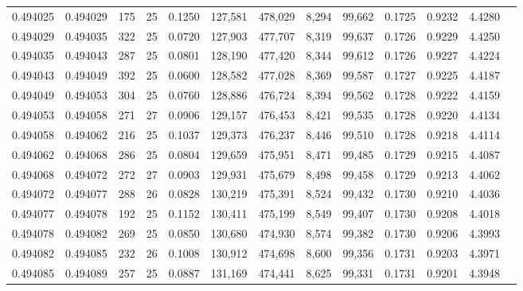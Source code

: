 \begin{tabular}{rrrrrrrrrrrrr}
0.494025 & 0.494029 & 175 &  25 &                                     0.1250 & 127,581 & 478,029 &   8,294 &  99,662 & 0.1725 & 0.9232 & 4.4280 \\
0.494029 & 0.494035 & 322 &  25 &                                     0.0720 & 127,903 & 477,707 &   8,319 &  99,637 & 0.1726 & 0.9229 & 4.4250 \\
0.494035 & 0.494043 & 287 &  25 &                                     0.0801 & 128,190 & 477,420 &   8,344 &  99,612 & 0.1726 & 0.9227 & 4.4224 \\
0.494043 & 0.494049 & 392 &  25 &                                     0.0600 & 128,582 & 477,028 &   8,369 &  99,587 & 0.1727 & 0.9225 & 4.4187 \\
0.494049 & 0.494053 & 304 &  25 &                                     0.0760 & 128,886 & 476,724 &   8,394 &  99,562 & 0.1728 & 0.9222 & 4.4159 \\
0.494053 & 0.494058 & 271 &  27 &                                     0.0906 & 129,157 & 476,453 &   8,421 &  99,535 & 0.1728 & 0.9220 & 4.4134 \\
0.494058 & 0.494062 & 216 &  25 &                                     0.1037 & 129,373 & 476,237 &   8,446 &  99,510 & 0.1728 & 0.9218 & 4.4114 \\
0.494062 & 0.494068 & 286 &  25 &                                     0.0804 & 129,659 & 475,951 &   8,471 &  99,485 & 0.1729 & 0.9215 & 4.4087 \\
0.494068 & 0.494072 & 272 &  27 &                                     0.0903 & 129,931 & 475,679 &   8,498 &  99,458 & 0.1729 & 0.9213 & 4.4062 \\
0.494072 & 0.494077 & 288 &  26 &                                     0.0828 & 130,219 & 475,391 &   8,524 &  99,432 & 0.1730 & 0.9210 & 4.4036 \\
0.494077 & 0.494078 & 192 &  25 &                                     0.1152 & 130,411 & 475,199 &   8,549 &  99,407 & 0.1730 & 0.9208 & 4.4018 \\
0.494078 & 0.494082 & 269 &  25 &                                     0.0850 & 130,680 & 474,930 &   8,574 &  99,382 & 0.1730 & 0.9206 & 4.3993 \\
0.494082 & 0.494085 & 232 &  26 &                                     0.1008 & 130,912 & 474,698 &   8,600 &  99,356 & 0.1731 & 0.9203 & 4.3971 \\
0.494085 & 0.494089 & 257 &  25 &                                     0.0887 & 131,169 & 474,441 &   8,625 &  99,331 & 0.1731 & 0.9201 & 4.3948 \\

\end{tabular}
